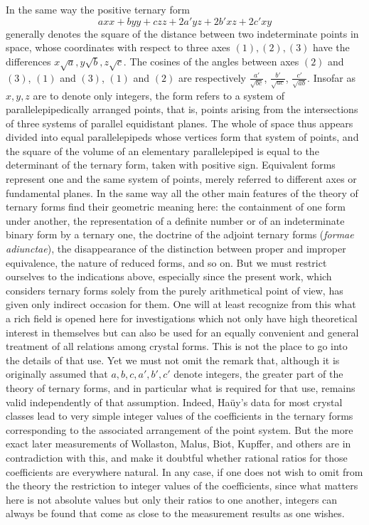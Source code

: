 \documentclass[12pt]{article}
\begin{document}
In the same way the positive ternary form
\[
axx+byy+czz+2a'yz+2b'xz+2c'xy
\]
generally denotes the square of the distance between two indeterminate points in space, whose coordinates with respect to three axes $(1),(2),(3)$ have the differences $x\sqrt a,y\sqrt b,z\sqrt c$. The cosines of the angles between axes $(2)$ and $(3)$, $(1)$ and $(3)$, $(1)$ and $(2)$ are respectively $\frac{a'}{\sqrt{bc}}$, $\frac{b'}{\sqrt{ac}}$, $\frac{c'}{\sqrt{ab}}$. Insofar as $x,y,z$ are to denote only integers, the form refers to a system of parallelepipedically arranged points, that is, points arising from the intersections of three systems of parallel equidistant planes. The whole of space thus appears divided into equal parallelepipeds whose vertices form that system of points, and the square of the volume of an elementary parallelepiped is equal to the determinant of the ternary form, taken with positive sign. Equivalent forms represent one and the same system of points, merely referred to different axes or fundamental planes. In the same way all the other main features of the theory of ternary forms find their geometric meaning here: the containment of one form under another, the representation of a definite number or of an indeterminate binary form by a ternary one, the doctrine of the adjoint ternary forms (\textit{formae adiunctae}), the disappearance of the distinction between proper and improper equivalence, the nature of reduced forms, and so on. But we must restrict ourselves to the indications above, especially since the present work, which considers ternary forms solely from the purely arithmetical point of view, has given only indirect occasion for them. One will at least recognize from this what a rich field is opened here for investigations which not only have high theoretical interest in themselves but can also be used for an equally convenient and general treatment of all relations among crystal forms. This is not the place to go into the details of that use. Yet we must not omit the remark that, although it is originally assumed that $a,b,c,a',b',c'$ denote integers, the greater part of the theory of ternary forms, and in particular what is required for that use, remains valid independently of that assumption. Indeed, Haüy's data for most crystal classes lead to very simple integer values of the coefficients in the ternary forms corresponding to the associated arrangement of the point system. But the more exact later measurements of Wollaston, Malus, Biot, Kupffer, and others are in contradiction with this, and make it doubtful whether rational ratios for those coefficients are everywhere natural. In any case, if one does not wish to omit from the theory the restriction to integer values of the coefficients, since what matters here is not absolute values but only their ratios to one another, integers can always be found that come as close to the measurement results as one wishes.
\end{document}
